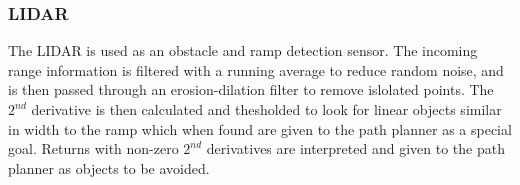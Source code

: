 \subsubsection{LIDAR}

The LIDAR is used as an obstacle and ramp detection sensor. The incoming range information is filtered with a running average to reduce random noise, and is then passed through an erosion-dilation filter to remove islolated points. The $2^{nd}$ derivative is then calculated and thesholded to look for linear objects similar in width to the ramp which when found are given to the path planner as a special goal. Returns with non-zero $2^{nd}$ derivatives are interpreted and given to the path planner as objects to be avoided.

